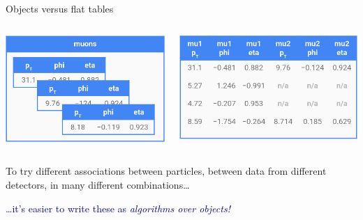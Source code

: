 \documentclass[aspectratio=169]{beamer}
\begin{document}
\begin{frame}{Objects versus flat tables}
\vspace{0.5 cm}
\begin{columns}[b]
\includegraphics[width=\linewidth]{muons-as-objects.png}

\includegraphics[width=\linewidth]{muons-as-a-table.png}
\vspace{0.61 cm}
\end{columns}

\vspace{0.2 cm}
To try different associations between particles, between data from different detectors, in many different combinations\ldots

\vspace{0.2 cm}
\hfill \textcolor{darkblue}{\ldots it's easier to write these as {\it algorithms over objects!}}
\end{frame}
\end{document}
